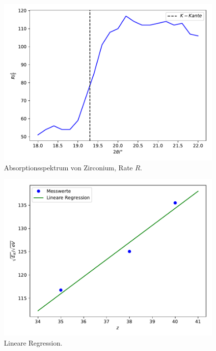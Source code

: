 \begin{figure}
  \centering
  \includegraphics[scale=0.7]{Zirkonium.pdf}
  \caption{Absorptionsspektrum von Zirconium, Rate $R$.}
  \label{abb:zirconium} %
\end{figure}
\begin{figure}
  \centering
  \includegraphics[scale=0.7]{Lineare Regression.pdf}
  \caption{Lineare Regression.}
  \label{abb:lineare_Regression} %
\end{figure}
